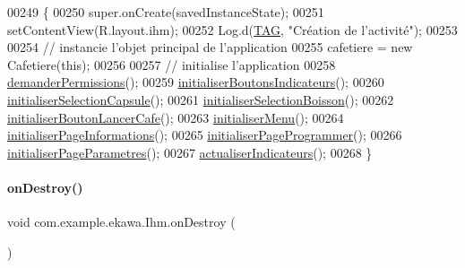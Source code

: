 \begin{DoxyCode}
00249     \{
00250         super.onCreate(savedInstanceState);
00251         setContentView(R.layout.ihm);
00252         Log.d(\hyperlink{classcom_1_1example_1_1ekawa_1_1_ihm_a95cd92c2acaf9f8982302da08d94f9aa}{TAG}, \textcolor{stringliteral}{"Création de l'activité"});
00253 
00254         \textcolor{comment}{// instancie l'objet principal de l'application}
00255         cafetiere = \textcolor{keyword}{new} Cafetiere(\textcolor{keyword}{this});
00256 
00257         \textcolor{comment}{// initialise l'application}
00258         \hyperlink{classcom_1_1example_1_1ekawa_1_1_ihm_a30e0dc3bf57b1abc608cb8b932527566}{demanderPermissions}();
00259         \hyperlink{classcom_1_1example_1_1ekawa_1_1_ihm_ae38db41c355bc415b46f21f9d608d4b9}{initialiserBoutonsIndicateurs}();
00260         \hyperlink{classcom_1_1example_1_1ekawa_1_1_ihm_a32a1b0d802eef67b6c838d8839de7bdb}{initialiserSelectionCapsule}();
00261         \hyperlink{classcom_1_1example_1_1ekawa_1_1_ihm_a0a4086cea2ee9d6d18c957513706cbce}{initialiserSelectionBoisson}();
00262         \hyperlink{classcom_1_1example_1_1ekawa_1_1_ihm_a6616a5f240867f43c8e56f2b432e43be}{initialiserBoutonLancerCafe}();
00263         \hyperlink{classcom_1_1example_1_1ekawa_1_1_ihm_a60968cecc69df879805b531a5f2ae19c}{initialiserMenu}();
00264         \hyperlink{classcom_1_1example_1_1ekawa_1_1_ihm_ad431346f0a437b4f23697208c5048a02}{initialiserPageInformations}();
00265         \hyperlink{classcom_1_1example_1_1ekawa_1_1_ihm_aa5ef2c0c4b4cefb518ec4f3e05b098aa}{initialiserPageProgrammer}();
00266         \hyperlink{classcom_1_1example_1_1ekawa_1_1_ihm_af18a3c8df11503003c92e8e5de89b7c3}{initialiserPageParametres}();
00267         \hyperlink{classcom_1_1example_1_1ekawa_1_1_ihm_a2c3740dd5be20b3111b36649514fd41e}{actualiserIndicateurs}();
00268     \}
\end{DoxyCode}
\mbox{\label{classcom_1_1example_1_1ekawa_1_1_ihm_a5ae27969ec39afede5d0cd36b469f145}} 
\paragraph{\texorpdfstring{on\+Destroy()}{onDestroy()}}
{\footnotesize\ttfamily void com.\+example.\+ekawa.\+Ihm.\+on\+Destroy (\begin{DoxyParamCaption}{ }\end{DoxyParamCaption})\hspace{0.3cm}{\ttfamily [protected]}}



